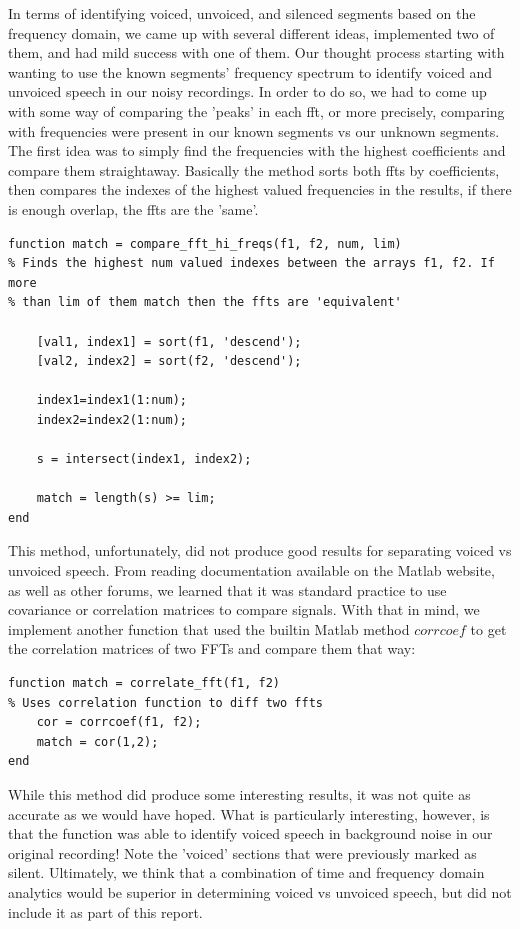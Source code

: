 \documentclass[11pt]{article}
\begin{document}
In terms of identifying voiced, unvoiced, and silenced segments based on the frequency domain, we came up with several different ideas, implemented two of them, and had mild success with one of them. Our thought process starting with wanting to use the known segments' frequency spectrum to identify voiced and unvoiced speech in our noisy recordings. In order to do so, we had to come up with some way of comparing the 'peaks' in each fft, or more precisely, comparing with frequencies were present in our known segments vs our unknown segments. The first idea was to simply find the frequencies with the highest coefficients and compare them straightaway. Basically the method sorts both ffts by coefficients, then compares the indexes of the highest valued frequencies in the results, if there is enough overlap, the ffts are the 'same'. 
\begin{lstlisting}
function match = compare_fft_hi_freqs(f1, f2, num, lim)
% Finds the highest num valued indexes between the arrays f1, f2. If more
% than lim of them match then the ffts are 'equivalent'

    [val1, index1] = sort(f1, 'descend');
    [val2, index2] = sort(f2, 'descend');

    index1=index1(1:num);
    index2=index2(1:num);

    s = intersect(index1, index2);

    match = length(s) >= lim;
end
\end{lstlisting}
This method, unfortunately, did not produce good results for separating voiced vs unvoiced speech. From reading documentation available on the Matlab website, as well as other forums, we learned that it was standard practice to use covariance or correlation matrices to compare signals. With that in mind, we implement another function that used the builtin Matlab method $corrcoef$ to get the correlation matrices of two FFTs and compare them that way:
\begin{lstlisting}
function match = correlate_fft(f1, f2)
% Uses correlation function to diff two ffts
    cor = corrcoef(f1, f2);
    match = cor(1,2);
end
\end{lstlisting}
While this method did produce some interesting results, it was not quite as accurate as we would have hoped. What is particularly interesting, however, is that the function was able to identify voiced speech in background noise in our original recording! Note the 'voiced' sections that were previously marked as silent.
Ultimately, we think that a combination of time and frequency domain analytics would be superior in determining voiced vs unvoiced speech, but did not include it as part of this report.
\end{document}
